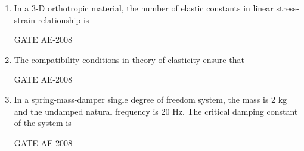 \documentclass[journal,12pt,onecolumn]{IEEEtran}
\theoremstyle{remark}
\begin{document}
\begin{enumerate}
\quad 

\item  In a 3-D orthotropic material, the number of elastic constants in linear stress-strain relationship is\\
    
    \begin{enumerate}
    \end{enumerate}
\hfill{GATE AE-2008}

\quad

    \item The compatibility conditions in theory of elasticity ensure that\\
    \begin{enumerate}
    \end{enumerate}
\hfill{GATE AE-2008}

\quad

    \item In a spring-mass-damper single degree of freedom system, the mass is 2 kg and the undamped natural frequency is 20 Hz. The critical damping constant of the system is\\
    \begin{enumerate}
    \end{enumerate}
\hfill{GATE AE-2008}


\end{enumerate}
\end{document}
